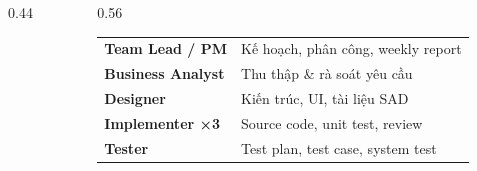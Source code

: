 \documentclass[aspectratio=169,10pt]{beamer}
\begin{document}
\begin{frame}
\begin{columns}[t]
\begin{column}{0.44\textwidth}
\begin{tcolorbox}[darkcard,title={WEEKLY SCRUM},height=3.1cm]
\end{tcolorbox}
\end{column}
\begin{column}{0.56\textwidth}
\begin{tcolorbox}[card,title={\textcolor{mred}{VAI TRÒ THEO RUP (mẫu)}},height=3.1cm]\footnotesize
\begin{tabular}{@{}p{3cm}p{5cm}@{}}
{\headfont\bfseries Team Lead / PM} & \textcolor{slate}{Kế hoạch, phân công, weekly report}\\
{\headfont\bfseries Business Analyst} & \textcolor{slate}{Thu thập \& rà soát yêu cầu}\\
{\headfont\bfseries Designer} & \textcolor{slate}{Kiến trúc, UI, tài liệu SAD}\\
{\headfont\bfseries\color{mred}Implementer ×3} & \textcolor{slate}{Source code, unit test, review}\\
{\headfont\bfseries Tester} & \textcolor{slate}{Test plan, test case, system test}\\
\end{tabular}
\end{tcolorbox}
\end{column}
\end{columns}
\end{frame}
\end{document}
